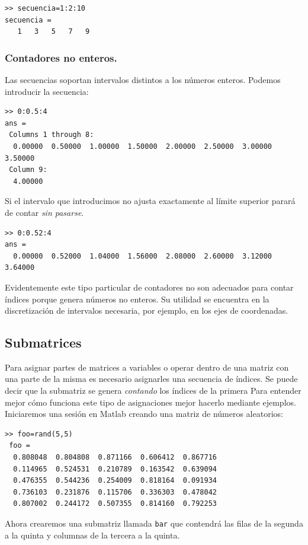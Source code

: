 \begin{lstlisting}
>> secuencia=1:2:10
secuencia =
   1   3   5   7   9
\end{lstlisting}


\subsubsection{Contadores no enteros.}

Las secuencias soportan intervalos distintos a los números enteros.
Podemos introducir la secuencia:

\begin{lstlisting}
>> 0:0.5:4
ans =
 Columns 1 through 8:
  0.00000  0.50000  1.00000  1.50000  2.00000  2.50000  3.00000  3.50000
 Column 9:
  4.00000
\end{lstlisting}

Si el intervalo que introducimos no ajusta exactamente al límite
superior parará de contar \emph{sin pasarse}.

\begin{lstlisting}
>> 0:0.52:4
ans =
  0.00000  0.52000  1.04000  1.56000  2.08000  2.60000  3.12000  3.64000
\end{lstlisting}
Evidentemente este tipo particular de contadores no son adecuados para
contar índices porque genera números no enteros. Su utilidad
se encuentra en la discretización de intervalos necesaria, por ejemplo,
en los ejes de coordenadas.


\subsection{Submatrices}

Para asignar partes de matrices a variables o operar dentro de una
matriz con una parte de la misma es necesario asignarles una secuencia
de índices. Se puede decir que la submatriz se genera \emph{contando}
los índices de la primera Para entender mejor cómo funciona este tipo
de asignaciones mejor hacerlo mediante ejemplos. Iniciaremos una
sesión en Matlab creando una matriz de números aleatorios:

\begin{lstlisting}
>> foo=rand(5,5)
 foo =
  0.808048  0.804808  0.871166  0.606412  0.867716
  0.114965  0.524531  0.210789  0.163542  0.639094
  0.476355  0.544236  0.254009  0.818164  0.091934
  0.736103  0.231876  0.115706  0.336303  0.478042
  0.807002  0.244172  0.507355  0.814160  0.792253
\end{lstlisting}
Ahora crearemos una submatriz llamada \texttt{bar} que contendrá las
filas de la segunda a la quinta y columnas de la tercera a la quinta.

